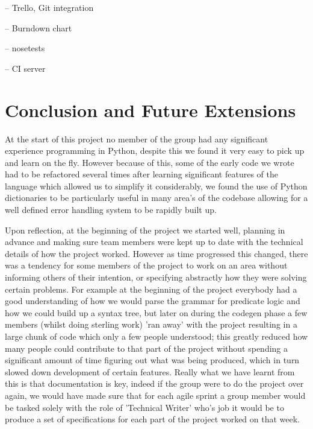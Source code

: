 \documentclass[a4paper, 11pt]{article}
\begin{document}
    -- Trello, Git integration

    -- Burndown chart

    -- nosetests

    -- CI server
 

\section{Conclusion and Future Extensions}


  At the start of this project no member of the group had any significant
  experience programming in Python, despite this we found it very easy to pick
  up and learn on the fly. However because of this, some of the early code we
  wrote had to be refactored several times after learning significant features
  of the language which allowed us to simplify it considerably, we found the use
  of Python dictionaries to be particularly useful in many area's of the
  codebase allowing for a well defined error handling system to be rapidly built
  up.

  Upon reflection, at the beginning of the project we started well, planning
  in advance and making sure team members were kept up to date with the
  technical details of how the project worked. However as time progressed this
  changed, there was a tendency for some members of the project to work on an
  area without informing others of their intention, or specifying abstractly
  how they were solving certain problems. For example at the beginning of the
  project everybody had a good understanding of how we would parse the grammar
  for predicate logic and how we could build up a syntax tree, but later on
  during the codegen phase a few members (whilst doing sterling work) 'ran away'
  with the project resulting in a large chunk of code which only a few people
  understood; this greatly reduced how many people could contribute to that part
  of the project without spending a significant amount of time figuring out what
  was being produced, which in turn slowed down development of certain features.
  Really what we have learnt from this is that documentation is key, indeed if the
  group were to do the project over again, we would have made sure that for each
  agile sprint a group member would be tasked solely with the role of 'Technical
  Writer' who's job it would be to produce a set of specifications for each part
  of the project worked on that week. 
\end{document}
